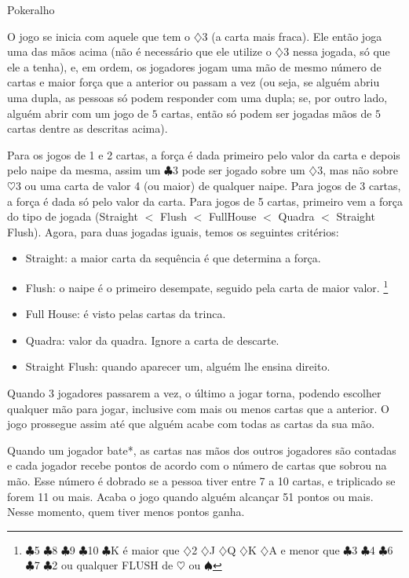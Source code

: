 \begin{subsecao}{Pokeralho}
\begin{itemize}
\end{itemize}

O jogo se inicia com aquele que tem o $\diamondsuit$3 (a carta mais fraca). Ele
então joga uma das mãos acima (não é necessário que ele utilize
o $\diamondsuit$3 nessa jogada, só que ele a tenha), e, em ordem, os jogadores
jogam uma mão de mesmo número de cartas e maior força que a anterior ou passam
a vez (ou seja, se alguém abriu uma dupla, as pessoas só podem responder com
uma dupla; se, por outro lado, alguém abrir com um jogo de $5$ cartas, então só
podem ser jogadas mãos de $5$ cartas dentre as descritas acima). 

Para os jogos de 1 e 2 cartas, a força é dada primeiro pelo valor da carta e
depois pelo naipe da mesma, assim um $\clubsuit$3  pode ser jogado sobre
um $\diamondsuit$3, mas não sobre $\heartsuit$3 ou uma carta de valor 4 (ou
maior) de qualquer naipe. Para jogos de 3 cartas, a força é dada só pelo valor
da carta. Para jogos de 5 cartas, primeiro vem a força do tipo de
jogada (Straight $<$ Flush $<$ FullHouse $<$ Quadra $<$ Straight Flush). Agora,
para duas jogadas iguais, temos os seguintes critérios:
\begin{itemize}
	\item Straight: a maior carta da sequência é que determina a força.
	\item Flush: o naipe é o primeiro desempate, seguido pela carta de maior
valor. \footnote{ $\clubsuit$5 $\clubsuit$8 $\clubsuit$9 $\clubsuit$10 $\clubsuit$K
é maior que $\diamondsuit$2 $\diamondsuit$J $\diamondsuit$Q $\diamondsuit$K
$\diamondsuit$A e menor que $\clubsuit$3 $\clubsuit$4 $\clubsuit$6 $\clubsuit$7
$\clubsuit$2 ou qualquer FLUSH de $\heartsuit$  ou $\spadesuit$ }
	\item Full House: é visto pelas cartas da trinca.	
	\item Quadra: valor da quadra. Ignore a carta de descarte.
	\item Straight Flush: quando aparecer um, alguém lhe ensina direito.
\end{itemize}

Quando 3 jogadores passarem a vez, o último a jogar torna, podendo escolher
qualquer mão para jogar, inclusive com mais ou menos cartas que a anterior. O
jogo prossegue assim até que alguém acabe com todas as cartas da sua mão. 

Quando um jogador bate*, as cartas nas mãos dos outros jogadores são contadas e
cada jogador recebe pontos de acordo com o número de cartas que sobrou na mão.
Esse número é dobrado se a pessoa tiver entre 7 a 10 cartas, e triplicado se
forem 11 ou mais. Acaba o jogo quando alguém alcançar 51 pontos ou mais. Nesse
momento, quem tiver menos pontos ganha.


\end{subsecao}
